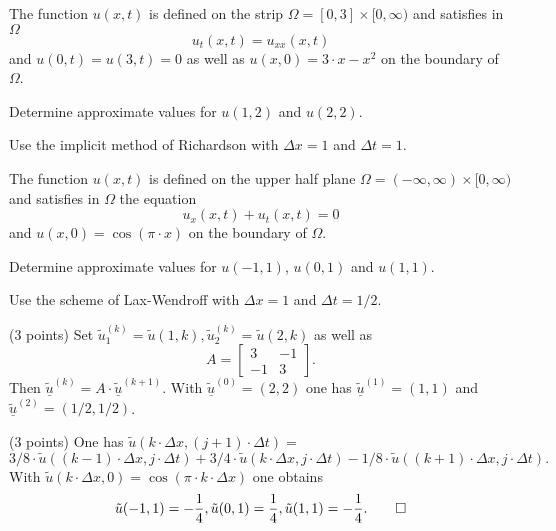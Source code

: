 \begin{teilaufgaben}
\item
The function $u(x,t)$ is defined on the strip
$\Omega = [0, 3] \times [0,\infty)$ %
and satisfies in $\Omega$
\[
u_{t}(x,t) = u_{xx}(x,t)
\]
and $u(0,t) = u(3,t) = 0$ as well as $u(x,0) = 3 \cdot x - x^2$
on the boundary of $\Omega$.

Determine approximate values for $u(1,2)$ and $u(2,2)$. 

Use the implicit method of Richardson with $\Delta x = 1$ and $\Delta t = 1.$

\item
The function $u(x,t)$ is defined on the upper half plane
$\Omega = (-\infty,\infty) \times [0,\infty)$ %
and satisfies in $\Omega$ the equation
\[
u_{x}(x,t) + u_{t}(x,t) = 0
\]
and  $u(x,0) = \cos(\pi \cdot x)$ on the boundary of $\Omega$.

Determine approximate values for $u(-1,1)$, $u(0,1)$ and $u(1,1)$. 

Use the scheme of Lax-Wendroff with $\Delta x = 1$ and $\Delta t = 1/2.$
\end{teilaufgaben}

\begin{loesung}
\begin{teilaufgaben}
\item
(3 points) Set
$\tilde u_1^{(k)} = \tilde u(1,k), \tilde u_2^{(k)} = \tilde u(2,k)$
as well as
\[
A = \left[\begin{array}{rr} 3 & -1  \\ -1 & 3  \end{array}\right].
\]
Then $\underline{\tilde u}^{(k)} = A \cdot \underline{\tilde u}^{(k+1)}$.
With $\underline{\tilde u}^{(0)} = (2,2)$ one has
$\underline{\tilde u}^{(1)} = (1,1)$ and
$\underline{\tilde u}^{(2)} = (1/2,1/2)$. 
\item
(3 points) One has $\tilde u(k \cdot \Delta x, (j+1) \cdot \Delta t) =$
\[
3/8 \cdot \tilde u((k-1) \cdot \Delta x, j \cdot \Delta t)
+ 3/4 \cdot \tilde u(k \cdot \Delta x, j \cdot \Delta t)
- 1/8 \cdot \tilde u((k+1) \cdot \Delta x, j \cdot \Delta t).
\]
With $\tilde u(k \cdot \Delta x, 0) = \cos(\pi \cdot k \cdot \Delta x)$
one obtains
\[
\tilde u(-1,1) = -\frac14, \tilde u(0,1) = \frac14, \tilde u(1,1) = -\frac14.
\qedhere
\]
\end{teilaufgaben}
\end{loesung}
